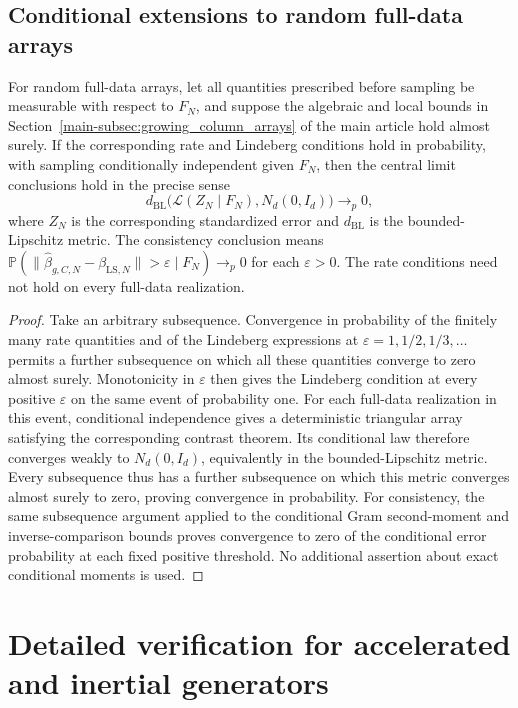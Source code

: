 \documentclass[11pt,a4paper,leqno]{article}
\numberwithin{equation}{section}
\numberwithin{figure}{section}
\numberwithin{table}{section}
\theoremstyle{plain}
\theoremstyle{definition}
\theoremstyle{remark}
\begin{document}
\subsection{Conditional extensions to random full-data arrays}
\label{supp:sec:array-conditional}
For random full-data arrays, let all quantities prescribed before sampling
be measurable with respect to \(F_N\), and suppose the algebraic and local
bounds in Section~\ref{main-subsec:growing_column_arrays} of the main
article hold almost surely. If the corresponding rate and Lindeberg
conditions hold in probability, with sampling conditionally independent
given \(F_N\), then the central limit conclusions hold in the precise sense
\[
 d_{\mathrm{BL}}\bigl(\mathcal L(Z_N\mid F_N),N_d(0,I_d)\bigr)\to_p0,
\]
where \(Z_N\) is the corresponding standardized error and
\(d_{\mathrm{BL}}\) is the bounded-Lipschitz metric.
The consistency conclusion means
\(\mathbb P(\|\widehat\beta_{g,C,N}-\beta_{\mathrm{LS},N}\|>\varepsilon\mid F_N)
\to_p0\) for each \(\varepsilon>0\).
The rate conditions need not hold on every full-data realization.
\begin{proof}
Take an arbitrary subsequence. Convergence in probability of the finitely
many rate quantities and of the Lindeberg expressions at
$\varepsilon=1,1/2,1/3,\ldots$ permits a further subsequence on which all
these quantities converge to zero almost surely. Monotonicity in
$\varepsilon$ then gives the Lindeberg condition at every positive
$\varepsilon$ on the same event of probability one.
For each full-data realization in this event, conditional independence
gives a deterministic triangular array satisfying the corresponding
contrast theorem. Its conditional law therefore converges weakly to
$N_d(0,I_d)$, equivalently in the bounded-Lipschitz metric.
Every subsequence thus has a further subsequence on which this metric
converges almost surely to zero, proving convergence in probability.
For consistency, the same subsequence argument applied to the conditional
Gram second-moment and inverse-comparison bounds proves convergence to
zero of the conditional error probability at each fixed positive threshold.
No additional assertion about exact conditional moments is used.
\end{proof}






\section{Detailed verification for accelerated and inertial generators}
\label{subsec:accelerated_generator_verification}
\end{document}

